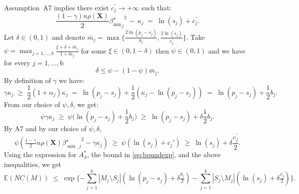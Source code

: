 \documentclass[aos]{imsart}
\theoremstyle{plain}
\newcommand{\E}{\mathbb{E}}
\newcommand{\bs}{\boldsymbol}
\begin{document}
Assumption~A7 implies there exist $c^{\prime}_j \to +\infty$ such that:
$$\frac{(1-\gamma) n\rho(\bs X)}{2}{{\beta_{\min}^{\star}}_j}^2 \,- \,\kappa_j \;=\; \ln(s_j) + c^{\prime}_{j}.$$
Let $\delta \in (0,1)$ and denote $\bar{m}_j=\max\big\{\frac{2\ln(p_j-s_j)}{b_{j}},\frac{2\ln(s_j)}{c^{\prime}_{j}}\big\}$. Take $\psi=\max_{j=1,\ldots,b}\frac{\xi + \delta + \bar{m}_j}{1+\bar{m}_j}$ for some $\xi \in(0, 1- \delta)$ then $\psi \in (0,1)$ and we have for every $j=1,\ldots,b$:
$$\delta \leq \psi-(1-\psi)\bar{m}_j.$$ 
By definition of $\gamma$ we have: 
$$
\gamma\kappa_j\;\geq\;\frac12 (1+\alpha_j)\kappa_j\;=\;\ln(p_j-s_j)+\frac12(\kappa_j-\ln(p_j-s_j)) \;=\; \ln(p_j-s_j)+ \frac12b_{j}.
$$
From our choice of $\psi,\delta$, we get:
$$\psi\gamma\kappa_j \;\geq\; \psi\big(\ln(p_j-s_j)+ \frac12b_{j}\big) \;\geq\;  \ln(p_j-s_j)+ \delta\frac12b_{j}.$$
By A7 and by our choice of $\psi,\delta$,
$$\psi\left(\tfrac{1-\gamma}{2} n \rho(\bs X) {\beta^{\star}_{\min,j}}^{2} - \gamma\kappa_j\right) \;\geq\; \psi\left(\ln(s_j)+c_j'\right) \;\geq\; \ln(s_j)+\delta \frac{c^{\prime}_j}{2}.
$$
Using the expression for $A_S^*$, the bound in \eqref{eq:boundexp}, and the above inequalities, we get
$$
\E(NC(M))\;\leq\;\exp\{- \sum_{j=1}^b |M_j\setminus S_j|(\ln(p_j-s_j)+\delta \tfrac{b_j}{2})-\sum_{j=1}^b |S_j\setminus M_j|(\ln(s_j)+\delta \tfrac{c^{\prime}_j}{2})\}.
$$
\end{document}
